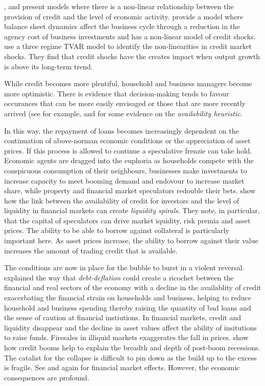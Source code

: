\documentclass[12pt, a4paper, oneside]{article} %
\begin{document}
\citet{Bernanke1999chapter}, \citet{BernankeGertler} and \citet{Azaraidis} present models where there is a non-linear relationship between  the provision of credit and the level of economic activity. \citet{BernankeGertlerAgency} provide a model where balance sheet dynamics affect the business cycle through a reduction in the agency cost of business investments and \citet{Balke} has a non-linear model of credit shocks.  \citet{Avdjiev2014} use a three regime TVAR model to identify the non-linearities in credit market shocks.  They find that credit shocks have the creates impact when output growth is above its long-term trend. 

While credit becomes more plentiful, household and business managers become more optimistic.  There is evidence that decision-making tends to favour occurances that can be more easily envisaged or those that are more recently arrived (see for example, \citet{KTAvailability} and \citet{Schwartzavailability} for some evidence on the \emph{availability heuristic}.   %

In this way, the repayment of loans becomes increasingly dependent on the continuation of above-norman economic conditions or the appreciation of asset prices.  If this process is allowed to continue a speculative frenzie can take hold.  Economic agents are dragged into the euphoria as households compete with the conspicuous consumption of their neighbours, businesses make investments to increase capacity to meet booming demand and endovour to increase market share, while property and financial market speculators redouble their bets.  \citet{BrunnermeierLiquidity} show how the link between the availability of credit for investors and the level of liquidity in financial markets can create \emph{liquidity spirals}.   They note, in particular, that the capital of speculators can drive market iquidity, risk premia and asset prices.  The ability to be able to borrow against collateral is particularly important here.  As asset prices increase, the ability to borrow against their value increases the amount of trading credit that is available.  

The conditions are now in place for the bubble to burst in a violent reversal.  \citet{FisherBD, FisherDD} explained the way that \emph{debt-deflation} could create a ricochet between the financial and real sectors of the economy with a decline in the availablity of credit exacerbating the financial strain on households and business, helping to reduce household and business spending thereby raising the quantity of bad loans and the sense of caution at financial instiutions. In financial markets, credit and liquidity disappear and the decline in asset values affect the ability of insitutions to raise funds.  Firesales in illiquid markets exaggerates the fall in prices. \citet{ReinhartRogoff} show how credit booms help to explain the breadth and depth of post-boom recessions.  The catalist for the collapse is difficult to pin down as the build up to the excess is fragile.  See \citet{Gorton2013} and \citet{BrunnermeierLiquidity} again for financial market effects. However, the economic consequences are profound.  
\end{document}
